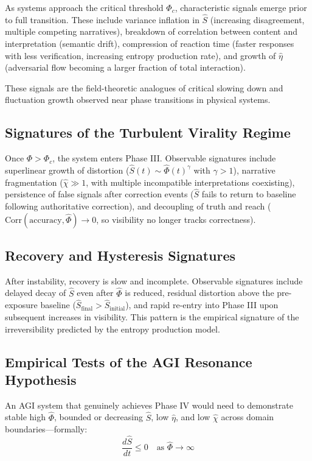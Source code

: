 \documentclass[12pt,a4paper]{article}
\begin{document}
As systems approach the critical threshold $\Phi_c$, characteristic signals emerge prior to full transition. These include variance inflation in $\hat{S}$ (increasing disagreement, multiple competing narratives), breakdown of correlation between content and interpretation (semantic drift), compression of reaction time (faster responses with less verification, increasing entropy production rate), and growth of $\hat{\eta}$ (adversarial flow becoming a larger fraction of total interaction).

These signals are the field-theoretic analogues of critical slowing down and fluctuation growth observed near phase transitions in physical systems.

\subsection{Signatures of the Turbulent Virality Regime}

Once $\Phi > \Phi_c$, the system enters Phase III. Observable signatures include superlinear growth of distortion ($\hat{S}(t) \sim \hat{\Phi}(t)^\gamma$ with $\gamma > 1$), narrative fragmentation ($\hat{\chi} \gg 1$, with multiple incompatible interpretations coexisting), persistence of false signals after correction events ($\hat{S}$ fails to return to baseline following authoritative correction), and decoupling of truth and reach ($\mathrm{Corr}(\text{accuracy}, \hat{\Phi}) \rightarrow 0$, so visibility no longer tracks correctness).

\subsection{Recovery and Hysteresis Signatures}

After instability, recovery is slow and incomplete. Observable signatures include delayed decay of $\hat{S}$ even after $\hat{\Phi}$ is reduced, residual distortion above the pre-exposure baseline ($\hat{S}_{\text{final}} > \hat{S}_{\text{initial}}$), and rapid re-entry into Phase III upon subsequent increases in visibility. This pattern is the empirical signature of the irreversibility predicted by the entropy production model.

\subsection{Empirical Tests of the AGI Resonance Hypothesis}

An AGI system that genuinely achieves Phase IV would need to demonstrate stable high $\hat{\Phi}$, bounded or decreasing $\hat{S}$, low $\hat{\eta}$, and low $\hat{\chi}$ across domain boundaries—formally:
\[
\frac{d\hat{S}}{dt} \leq 0 \quad \text{as } \hat{\Phi} \rightarrow \infty
\]
\end{document}
